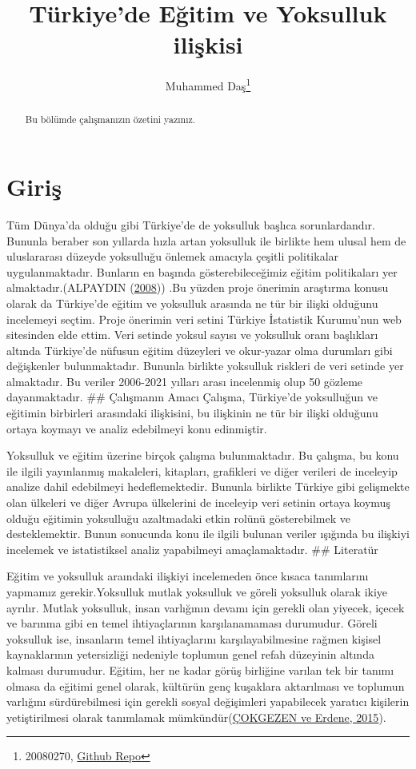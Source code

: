 \documentclass[
  12pt,
]{article}
\title{Türkiye'de Eğitim ve Yoksulluk ilişkisi}
\author{Muhammed Daş\footnote{20080270, \href{https://github.com/muhammedddas/deneme.git/muhammedddas/deneme}{Github Repo}}}
\date{}
\begin{document}
\maketitle
\begin{abstract}
Bu bölümde çalışmanızın özetini yazınız.
\end{abstract}

\hypertarget{giriux15f}{%
\section{Giriş}\label{giriux15f}}

Tüm Dünya'da olduğu gibi Türkiye'de de yoksulluk başlıca sorunlardandır. Bununla beraber son yıllarda hızla artan yoksulluk ile birlikte hem ulusal hem de uluslararası düzeyde yoksulluğu önlemek amacıyla çeşitli politikalar uygulanmaktadır. Bunların en başında gösterebileceğimiz eğitim politikaları yer almaktadır.(ALPAYDIN (\protect\hyperlink{ref-alpaydin2008turkiye}{2008})) .Bu yüzden proje önerimin araştırma konusu olarak da Türkiye'de eğitim ve yoksulluk arasında ne tür bir ilişki olduğunu incelemeyi seçtim. Proje önerimin veri setini Türkiye İstatistik Kurumu'nun web sitesinden elde ettim. Veri setinde yoksul sayısı ve yoksulluk oranı başlıkları altında Türkiye'de nüfusun eğitim düzeyleri ve okur-yazar olma durumları gibi değişkenler bulunmaktadır. Bununla birlikte yoksulluk riskleri de veri setinde yer almaktadır. Bu veriler 2006-2021 yılları arası incelenmiş olup 50 gözleme dayanmaktadır.
\#\# Çalışmanın Amacı
Çalışma, Türkiye'de yoksulluğun ve eğitimin birbirleri arasındaki ilişkisini, bu ilişkinin ne tür bir ilişki olduğunu ortaya koymayı ve analiz edebilmeyi konu edinmiştir.

Yoksulluk ve eğitim üzerine birçok çalışma bulunmaktadır. Bu çalışma, bu konu ile ilgili yayınlanmış makaleleri, kitapları, grafikleri ve diğer verileri de inceleyip analize dahil edebilmeyi hedeflemektedir. Bununla birlikte Türkiye gibi gelişmekte olan ülkeleri ve diğer Avrupa ülkelerini de inceleyip veri setinin ortaya koymuş olduğu eğitimin yoksulluğu azaltmadaki etkin rolünü gösterebilmek ve desteklemektir. Bunun sonucunda konu ile ilgili bulunan veriler ışığında bu ilişkiyi incelemek ve istatistiksel analiz yapabilmeyi amaçlamaktadır.
\#\# Literatür

Eğitim ve yoksulluk araındaki ilişkiyi incelemeden önce kısaca tanımlarını yapmamız gerekir.Yoksulluk mutlak yoksulluk ve göreli yoksulluk olarak ikiye ayrılır. Mutlak yoksulluk, insan varlığının devamı için gerekli olan yiyecek, içecek ve barınma gibi en temel ihtiyaçlarının karşılanamaması durumudur. Göreli yoksulluk ise, insanların temel ihtiyaçlarını karşılayabilmesine rağmen kişisel kaynaklarının yetersizliği nedeniyle toplumun genel refah düzeyinin altında kalması durumudur. Eğitim, her ne kadar görüş birliğine varılan tek bir tanımı olmasa da eğitimi genel olarak, kültürün genç kuşaklara aktarılması ve toplumun varlığını sürdürebilmesi için gerekli sosyal değişimleri yapabilecek yaratıcı kişilerin yetiştirilmesi olarak tanımlamak mümkündür(\protect\hyperlink{ref-ccokgezen2015gelicsmekte}{ÇOKGEZEN ve Erdene, 2015}).
\end{document}
